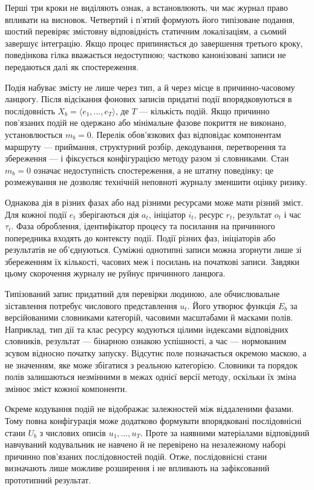 Перші три кроки не виділяють ознак, а встановлюють, чи має журнал право впливати на висновок. Четвертий і п’ятий формують його типізоване подання, шостий перевіряє змістовну відповідність статичним локалізаціям, а сьомий завершує інтеграцію. Якщо процес припиняється до завершення третього кроку, поведінкова гілка вважається недоступною; частково канонізовані записи не передаються далі як спостереження.

Подія набуває змісту не лише через тип, а й через місце в причинно-часовому ланцюгу. Після відсікання фонових записів придатні події впорядковуються в послідовність $X_b=\langle e_1,\ldots,e_T\rangle$, де $T$ --- кількість подій. Якщо причинно пов’язаних подій не одержано або мінімальне фазове покриття не виконано, установлюється $m_b=0$. Перелік обов’язкових фаз відповідає компонентам маршруту --- приймання, структурний розбір, декодування, перетворення та збереження --- і фіксується конфігурацією методу разом зі словниками. Стан $m_b=0$ означає недоступність спостереження, а не штатну поведінку; це розмежування не дозволяє технічній неповноті журналу зменшити оцінку ризику.

Однакова дія в різних фазах або над різними ресурсами може мати різний зміст. Для кожної події $e_t$ зберігаються дія $a_t$, ініціатор $i_t$, ресурс $r_t$, результат $o_t$ і час $\tau_t$. Фаза оброблення, ідентифікатор процесу та посилання на причинного попередника входять до контексту події. Події різних фаз, ініціаторів або результатів не об’єднуються. Суміжні однотипні записи можна згорнути лише зі збереженням їх кількості, часових меж і посилань на початкові записи. Завдяки цьому скорочення журналу не руйнує причинного ланцюга.

Типізований запис придатний для перевірки людиною, але обчислювальне зіставлення потребує числового представлення $u_t$. Його утворює функція $E_b$ за версійованими словниками категорій, часовими масштабами й масками полів. Наприклад, тип дії та клас ресурсу кодуються цілими індексами відповідних словників, результат --- бінарною ознакою успішності, а час --- нормованим зсувом відносно початку запуску. Відсутнє поле позначається окремою маскою, а не значенням, яке може збігатися з реальною категорією. Словники та порядок полів залишаються незмінними в межах однієї версії методу, оскільки їх зміна змінює зміст кожної компоненти.

Окреме кодування подій не відображає залежностей між віддаленими фазами. Тому повна конфігурація може додатково формувати впорядковані послідовнісні стани $U_b$ з числових описів $u_1,\ldots,u_T$. Проте за наявними матеріалами відповідний навчуваний кодувальник не навчено й не перевірено на незалежному наборі причинно пов’язаних послідовностей подій. Отже, послідовнісні стани визначають лише можливе розширення і не впливають на зафіксований прототипний результат.

